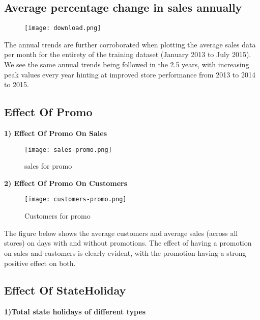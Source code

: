 \documentclass[letterpaper, 10 pt, conference]{ieeeconf}  %
\begin{document}
\subsection{Average percentage change in sales annually}


\begin{figure}[h!]
    \texttt{[image: download.png]}
\end{figure}

The annual trends are further corroborated when plotting the average sales data per month for the entirety of the training dataset (January 2013 to July 2015). We see the same annual trends being followed in the 2.5 years, with increasing peak values every year hinting at improved store performance from 2013 to 2014 to 2015.

\subsection{Effect Of Promo}
\textbf{1) Effect Of Promo On Sales}

\begin{figure}[h!]
    \centering
    \texttt{[image: sales-promo.png]}
    \caption{sales for promo}
\end{figure}

\bigskip
\bigskip

\textbf{2) Effect Of Promo On Customers}

\begin{figure}[h!]
    \centering
    \texttt{[image: customers-promo.png]}
    \caption{Customers for promo}
\end{figure}

The figure below shows the average customers and average sales (across all stores) on days
with and without promotions. The effect of having a promotion on sales and customers is
clearly evident, with the promotion having a strong positive effect on both.

\subsection{Effect Of StateHoliday}

\textbf{1)Total state holidays of different types}
\end{document}
